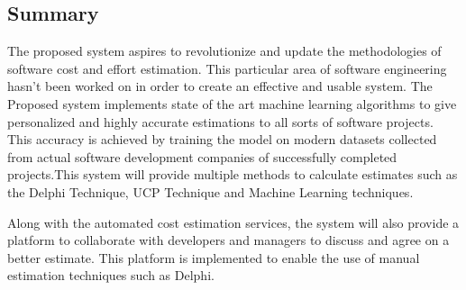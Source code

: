 \subsection{Summary}
The proposed system aspires to revolutionize and update the methodologies of software cost and effort estimation. This particular area of software engineering hasn't been worked on in order to create an effective and usable system. The Proposed system implements state of the art machine learning algorithms to give personalized and highly accurate estimations to all sorts of software projects. This accuracy is achieved by training the model on modern datasets collected from actual software development companies of successfully completed projects.This system will provide multiple methods to calculate estimates such as the Delphi Technique, UCP Technique and Machine Learning techniques.


Along with the automated cost estimation services, the system will also provide a platform to collaborate with developers and managers to discuss and agree on a better estimate. This platform is implemented to enable the use of manual estimation techniques such as Delphi.




